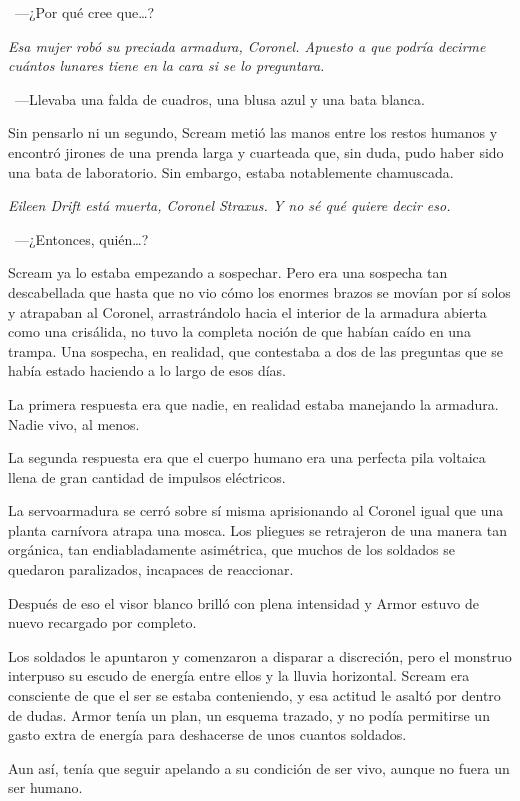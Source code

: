 ~---¿Por qué cree que\dots{}?

\emph{Esa mujer robó su preciada armadura, Coronel. Apuesto a que podría decirme cuántos lunares tiene en la cara si se lo preguntara.}

~---Llevaba una falda de cuadros, una blusa azul y una bata blanca.

Sin pensarlo ni un segundo, Scream metió las manos entre los restos humanos y encontró jirones de una prenda larga y cuarteada que, sin duda, pudo haber sido una bata de laboratorio. Sin embargo, estaba notablemente chamuscada.

\emph{Eileen Drift está muerta, Coronel Straxus. Y no sé qué quiere decir eso.}

~---¿Entonces, quién\dots{}?

Scream ya lo estaba empezando a sospechar. Pero era una sospecha tan descabellada que hasta que no vio cómo los enormes brazos se movían por sí solos y atrapaban al Coronel, arrastrándolo hacia el interior de la armadura abierta como una crisálida, no tuvo la completa noción de que habían caído en una trampa. Una sospecha, en realidad, que contestaba a dos de las preguntas que se había estado haciendo a lo largo de esos días.

La primera respuesta era que nadie, en realidad estaba manejando la armadura. Nadie vivo, al menos.

La segunda respuesta era que el cuerpo humano era una perfecta pila voltaica llena de gran cantidad de impulsos eléctricos.

La servoarmadura se cerró sobre sí misma aprisionando al Coronel igual que una planta carnívora atrapa una mosca. Los pliegues se retrajeron de una manera tan orgánica, tan endiabladamente asimétrica, que muchos de los soldados se quedaron paralizados, incapaces de reaccionar.

Después de eso el visor blanco brilló con plena intensidad y Armor estuvo de nuevo recargado por completo.

Los soldados le apuntaron y comenzaron a disparar a discreción, pero el monstruo interpuso su escudo de energía entre ellos y la lluvia horizontal. Scream era consciente de que el ser se estaba conteniendo, y esa actitud le asaltó por dentro de dudas. Armor tenía un plan, un esquema trazado, y no podía permitirse un gasto extra de energía para deshacerse de unos cuantos soldados.

Aun así, tenía que seguir apelando a su condición de ser vivo, aunque no fuera un ser humano.

